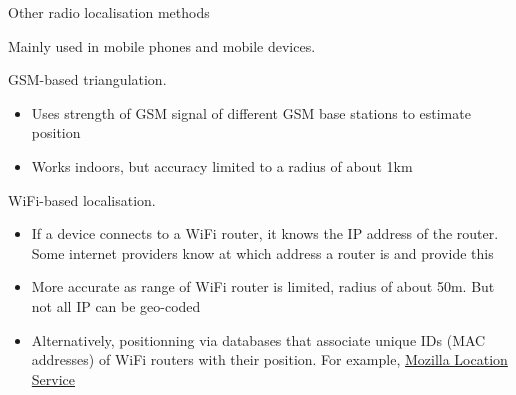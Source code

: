 \documentclass[compress]{beamer}
\begin{document}
\begin{frame}{Other radio localisation methods}

Mainly used in mobile phones and mobile devices.

GSM-based triangulation.

\begin{itemize}

\item
  Uses strength of GSM signal of different GSM base stations to estimate
  position
\item
  Works indoors, but accuracy limited to a radius of about 1km
\end{itemize}

\pause

WiFi-based localisation.

\begin{itemize}
\item
  If a device connects to a WiFi router, it knows the IP address of the
  router. Some internet providers know at which address a router is and
  provide this
\item More accurate as range of WiFi router is limited, radius of about 50m.
  But not all IP can be geo-coded
\item Alternatively, positionning via databases that associate unique IDs (MAC
    addresses) of WiFi routers with their position. For example,
        \href{https://location.services.mozilla.com/}{Mozilla Location Service}

\end{itemize}

\end{frame}
\end{document}
